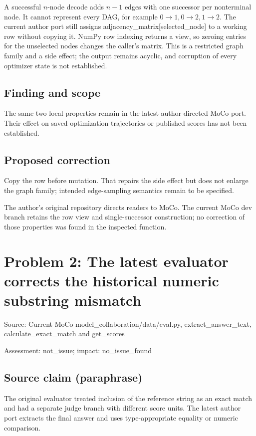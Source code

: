 \documentclass[11pt]{article}
\begin{document}
A successful \(n\)-node decode adds \(n-1\) edges with one successor per nonterminal node. It cannot represent every DAG, for example \(0\to1,0\to2,1\to2\). The current author port still assigns adjacency\_matrix[selected\_node] to a working row without copying it. NumPy row indexing returns a view, so zeroing entries for the unselected nodes changes the caller’s matrix. This is a restricted graph family and a side effect; the output remains acyclic, and corruption of every optimizer state is not established.

\subsection*{Finding and scope}

The same two local properties remain in the latest author-directed MoCo port. Their effect on saved optimization trajectories or published scores has not been established.

\subsection*{Proposed correction}

Copy the row before mutation. That repairs the side effect but does not enlarge the graph family; intended edge-sampling semantics remain to be specified.

The author’s original repository directs readers to MoCo. The current MoCo dev branch retains the row view and single-successor construction; no correction of those properties was found in the inspected function.

\section*{Problem 2: The latest evaluator corrects the historical numeric substring mismatch}

Source: Current MoCo model\_collaboration/data/eval.py, extract\_answer\_text, calculate\_exact\_match and get\_scores

Assessment: not\_issue; impact: no\_issue\_found

\subsection*{Source claim (paraphrase)}

The original evaluator treated inclusion of the reference string as an exact match and had a separate judge branch with different score units. The latest author port extracts the final answer and uses type-appropriate equality or numeric comparison.
\end{document}
